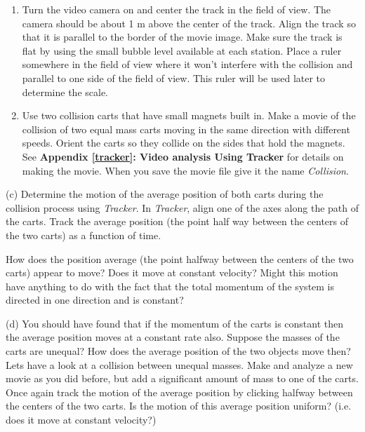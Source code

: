\begin{enumerate}
\item Turn the video camera on and center the track in the field of view. The camera
should be about 1 m above the center of the track. Align the track so that it
is parallel to the border of the movie image. Make sure the track is flat by
using the small bubble level available at each station. Place a ruler somewhere in
the field of view where it won't interfere with the collision and parallel to
one side of the field of view. This ruler will be used later to determine the
scale. 
\item Use two collision carts that have small magnets built in. Make a movie of the
collision of two equal mass carts moving in the same direction with different
speeds. Orient the carts so they collide on the sides that hold the magnets.
See \textbf{Appendix \ref{tracker}: Video analysis Using Tracker} for details on making the movie. When
you save the movie file give it the name \textit{Collision}. 
\end{enumerate}
(c) Determine the motion of the average position of both carts during the collision process 
using \textit{Tracker}. In \textit{Tracker}, align one of the axes along the path of the carts. 
Track the average position (the point half way between the centers of the two carts) as a function 
of time.

\newpage

How does the position average (the point halfway between the centers of the two carts) appear to move? Does it move at constant velocity? Might this motion have anything to do with the fact that the total momentum of the system is directed in one direction and is constant?
\vspace{40mm}

(d) You should have found that if the momentum of the carts is constant then
the average position moves at a constant rate also. Suppose the masses of the
carts are unequal? How does the average position of the two objects move then?
Lets have a look at a collision between unequal masses. Make and analyze a new
movie as you did before, but add a significant amount of mass to one of the
carts. Once again track the motion of the average position by clicking halfway
between the centers of the two carts. Is the motion of this average position
uniform? (i.e. does it move at constant velocity?)
\vspace{40mm}

